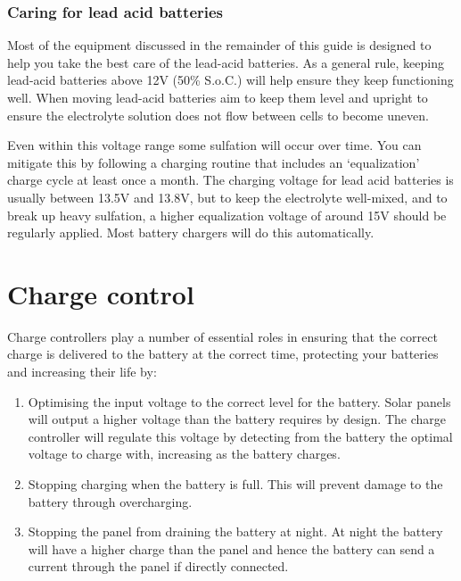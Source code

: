 \documentclass{article}
\theoremstyle{definition}
\theoremstyle{definition}
\theoremstyle{remark}
\begin{document}

    \subsubsection{Caring for lead acid batteries} %
    \label{ssub:caring_for_lead_acid_batteries}

      Most of the equipment discussed in the remainder of this guide is designed to help you take the best care of the lead-acid batteries. As a general rule, keeping lead-acid batteries above 12V (50\% S.o.C.) will help ensure they keep functioning well. When moving lead-acid batteries aim to keep them level and upright to ensure the electrolyte solution does not flow between cells to become uneven.

      Even within this voltage range some sulfation will occur over time. You can mitigate this by following a charging routine that includes an ‘equalization’ charge cycle at least once a month. The charging voltage for lead acid batteries is usually between 13.5V and 13.8V, but to keep the electrolyte well-mixed, and to break up heavy sulfation, a higher equalization voltage of around 15V should be regularly applied. Most battery chargers will do this automatically. 





\section{Charge control} %
\label{sec:charge_control}

  Charge controllers play a number of essential roles in ensuring that the correct charge is delivered to the battery at the correct time, protecting your batteries and increasing their life by: 

  \begin{enumerate}
    \item Optimising the input voltage to the correct level for the battery. Solar panels will output a higher voltage than the battery requires by design. The charge controller will regulate this voltage by detecting from the battery the optimal voltage to charge with, increasing as the battery charges. 
    \item Stopping charging when the battery is full. This will prevent damage to the battery through overcharging. 
    \item Stopping the panel from draining the battery at night. At night the battery will have a higher charge than the panel and hence the battery can send a current through the panel if directly connected. 
  \end{enumerate}
\end{document}
